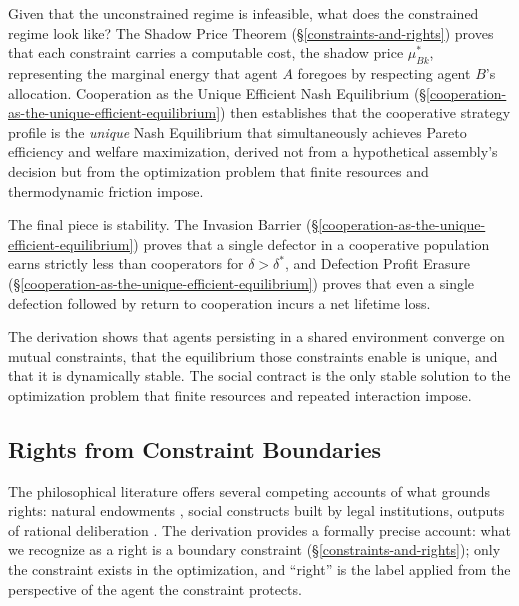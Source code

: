 \documentclass[11pt]{article}
\theoremstyle{plain}
\theoremstyle{definition}
\theoremstyle{remark}
\let\origsubsection\subsection
\renewcommand{\subsection}{\needspace{7\baselineskip}\origsubsection}
\begin{document}
Given that the unconstrained regime is infeasible, what does the
constrained regime look like? The Shadow Price Theorem
(§\ref{constraints-and-rights}) proves that each constraint carries a
computable cost, the shadow price \(\mu^*_{Bk}\), representing the
marginal energy that agent \(A\) foregoes by respecting agent \(B\)'s
allocation. Cooperation as the Unique Efficient Nash Equilibrium
(§\ref{cooperation-as-the-unique-efficient-equilibrium}) then
establishes that the cooperative strategy profile is the \emph{unique}
Nash Equilibrium that simultaneously achieves Pareto efficiency and
welfare maximization, derived not from a hypothetical assembly's
decision but from the optimization problem that finite resources and
thermodynamic friction impose.

The final piece is stability. The Invasion Barrier
(§\ref{cooperation-as-the-unique-efficient-equilibrium}) proves that a
single defector in a cooperative population earns strictly less than
cooperators for \(\delta > \delta^*\), and Defection Profit Erasure
(§\ref{cooperation-as-the-unique-efficient-equilibrium}) proves that
even a single defection followed by return to cooperation incurs a net
lifetime loss.

The derivation shows that agents persisting in a shared environment
converge on mutual constraints, that the equilibrium those constraints
enable is unique, and that it is dynamically stable. The social contract
is the only stable solution to the optimization problem that finite
resources and repeated interaction impose.

\subsection{Rights from Constraint
Boundaries}\label{rights-from-constraint-boundaries}

The philosophical literature offers several competing accounts of what
grounds rights: natural endowments \citep{Locke1689}, social constructs
built by legal institutions, outputs of rational deliberation
\citep{Rawls1971}. The derivation provides a formally precise account:
what we recognize as a right is a boundary constraint
(§\ref{constraints-and-rights}); only the constraint exists in the
optimization, and ``right'' is the label applied from the perspective of
the agent the constraint protects.
\end{document}
